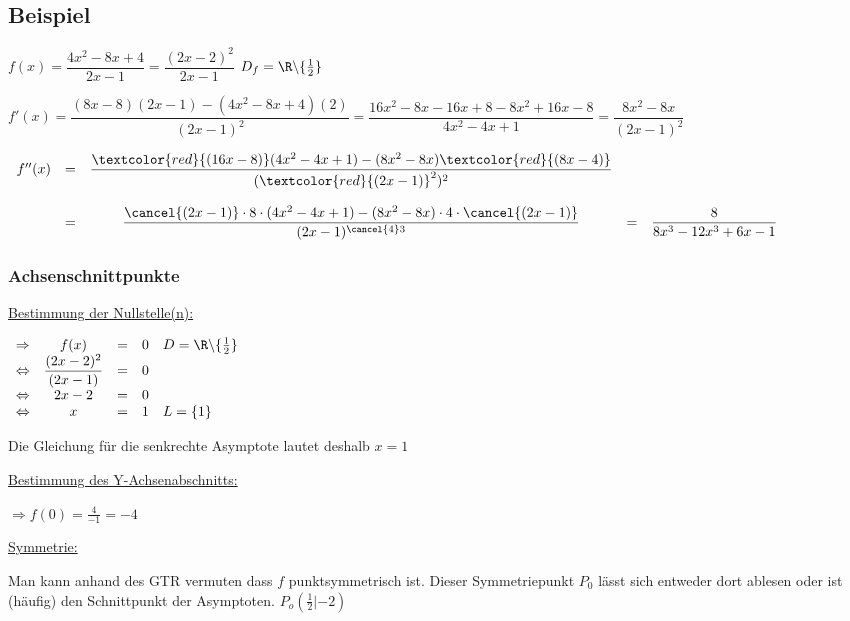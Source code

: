 \documentclass[main.tex]{subfiles}
\begin{document}
\subsection{Beispiel}

$f(x) = \dfrac{4x^2 -8x +4}{2x-1} = \dfrac{(2x-2)^2}{2x-1}$ \qquad \qquad $D_{f}=\R \backslash \{ \frac{1}{2} \}$

$f'(x) = \dfrac{(8x-8)(2x-1)-(4x^2-8x+4)(2)}{(2x-1)^2} = \dfrac{16x^2-8x-16x+8-8x^2+16x-8}{4x^2-4x+1} = \dfrac{8x^2-8x}{(2x-1)^2}$

$\begin{array}{rcccl}
	f''(x)  & = & \dfrac{\textcolor{red}{(16x-8)}(4x^2-4x+1)-(8x^2-8x)\textcolor{red}{(8x-4)}}{(\textcolor{red}{(2x-1)}^2)^2}\\ \\
	& = & \dfrac{\cancel{(2x-1)}\cdot 8 \cdot (4x^2-4x+1) - (8x^2-8x)\cdot 4 \cdot \cancel{(2x-1)}}{(2x-1)^{\cancel{4} 3}} & = & \dfrac{8}{8x^3-12x^3+6x-1} \\
\end{array}$


\subsubsection{Achsenschnittpunkte}

\underline{Bestimmung der Nullstelle(n):}

$\begin{array}{rcccl}
	\Rightarrow    &    f(x)    &    =    &    0 & D=\R \backslash \{ \frac{1}{2} \} \\
	\Leftrightarrow    &    \dfrac{(2x-2)^2}{(2x-1)}     &     =     &      0\\
	\Leftrightarrow    &    2x-2     &     =     &     0\\
	\Leftrightarrow    &    x      &    =     &     1   &  L = \{ 1 \}     \\
\end{array}$

Die Gleichung für die senkrechte Asymptote lautet deshalb $x=1$

\underline{Bestimmung des Y-Achsenabschnitts:}

$\Rightarrow f(0) = \frac{4}{-1} = -4$

\underline{Symmetrie:}

Man kann anhand des GTR vermuten dass $f$ punktsymmetrisch ist. Dieser Symmetriepunkt $P_{0}$ lässt sich entweder dort ablesen oder ist (häufig) den Schnittpunkt der Asymptoten. $P_{o}(\frac{1}{2}|-2)$
\end{document}
